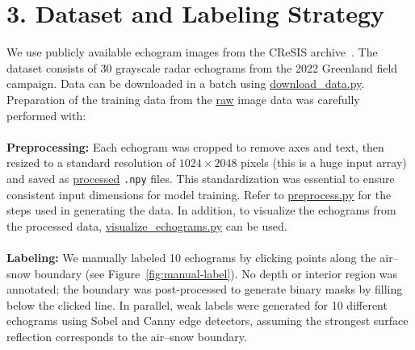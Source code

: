 \documentclass[11pt,oneside,openany]{article}
\begin{document}
\section*{3. Dataset and Labeling Strategy}
We use publicly available echogram images from the CReSIS archive~\cite{5}. The dataset consists of 30 grayscale radar echograms from the 2022 Greenland field campaign. Data can be downloaded in a batch using \href{https://github.com/Mohammad-Neutrino/EECS836_Machine_Learning/blob/trunk/Project/src/download_data.py}{download\_data.py}. Preparation of the training data from the \href{https://github.com/Mohammad-Neutrino/EECS836_Machine_Learning/tree/trunk/Project/data/raw}{raw} image data was carefully performed with:\\\\ 
\textbf{Preprocessing:} Each echogram was cropped to remove axes and text, then resized to a standard resolution of $1024 \times 2048$ pixels (this is a huge input array) and saved as \href{https://github.com/Mohammad-Neutrino/EECS836_Machine_Learning/tree/trunk/Project/data/processed}{processed} \texttt{.npy} files. This standardization was essential to ensure consistent input dimensions for model training. Refer to \href{https://github.com/Mohammad-Neutrino/EECS836_Machine_Learning/blob/trunk/Project/src/preprocess.py}{preprocess.py} for the steps used in generating the data. In addition, to visualize the echograms from the processed data, \href{https://github.com/Mohammad-Neutrino/EECS836_Machine_Learning/blob/trunk/Project/src/visualize_echograms.py}{visualize\_echograms.py} can be used.\\\\
\textbf{Labeling:} We manually labeled 10 echograms by clicking points along the air–snow boundary (see Figure~\ref{fig:manual-label}). No depth or interior region was annotated; the boundary was post-processed to generate binary masks by filling below the clicked line. In parallel, weak labels were generated for 10 different echograms using Sobel and Canny edge detectors, assuming the strongest surface reflection corresponds to the air–snow boundary.
\end{document}
